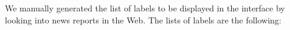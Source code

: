 

  

  
  
  
  
  




%
We manually generated the list of labels to be displayed in the interface by
looking into news reports in the Web.
%
The lists of labels are the following:

